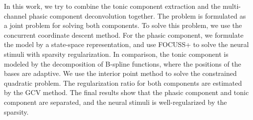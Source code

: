 \documentclass[10pt,conference]{ieeeconf}
\begin{document}
In this work, we try to combine the tonic component extraction and the multi-channel phasic component deconvolution together. The problem is formulated as a joint problem for solving both components. To solve this problem, we use the concurrent coordinate descent method. For the phasic component, we formulate the model by a state-space representation, and use FOCUSS+ to solve the neural stimuli with sparsity regularization. In comparison, the tonic component is modeled by the decomposition of B-spline functions, where the positions of the bases are adaptive. We use the interior point method to solve the constrained quadratic problem. The regularization ratio for both components are estimated by the GCV method. The final results show that the phasic component and tonic component are separated, and the neural stimuli is well-regularized by the sparsity.



\end{document}
